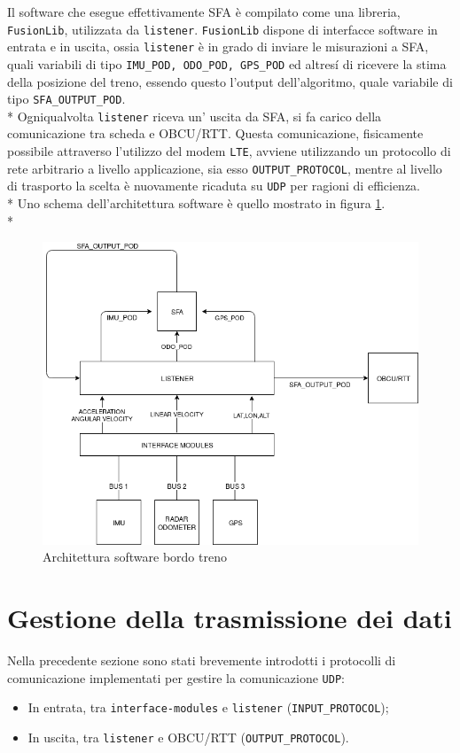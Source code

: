 Il software che esegue effettivamente SFA \`e compilato come una libreria, \texttt{FusionLib}, utilizzata da \texttt{listener}. \texttt{FusionLib} dispone di interfacce software in entrata e in uscita, ossia \texttt{listener} \`e in grado di inviare le misurazioni a SFA, quali variabili di tipo \texttt{IMU\_POD, ODO\_POD, GPS\_POD} ed altres\'i di ricevere la stima della posizione del treno, essendo questo l'output dell'algoritmo, quale variabile di tipo \texttt{SFA\_OUTPUT\_POD}.\\*
Ogniqualvolta \texttt{listener} riceva un' uscita da SFA, si fa carico della comunicazione tra scheda e OBCU/RTT. Questa comunicazione, fisicamente possibile attraverso l'utilizzo del modem \texttt{LTE}, avviene utilizzando un protocollo di rete arbitrario a livello applicazione, sia esso \texttt{OUTPUT\_PROTOCOL}, mentre al livello di trasporto la scelta \`e nuovamente ricaduta su \texttt{UDP} per ragioni di efficienza.\\*
Uno schema dell'architettura software \`e quello mostrato in figura \ref{fig:tdiagramint}.\\*
\begin{figure}[h]
	\centering
	\includegraphics[width=\linewidth]{img/InternalTrainSchema}
	\caption{Architettura software bordo treno}
	\label{fig:tdiagramint}
\end{figure}
\section{Gestione della trasmissione dei dati}
Nella precedente sezione sono stati brevemente introdotti i protocolli di comunicazione implementati per gestire la comunicazione \texttt{UDP}:
\begin{itemize}
	\item In entrata, tra \texttt{interface-modules} e \texttt{listener} (\texttt{INPUT\_PROTOCOL});
	\item In uscita, tra \texttt{listener} e OBCU/RTT (\texttt{OUTPUT\_PROTOCOL}).
\end{itemize}

